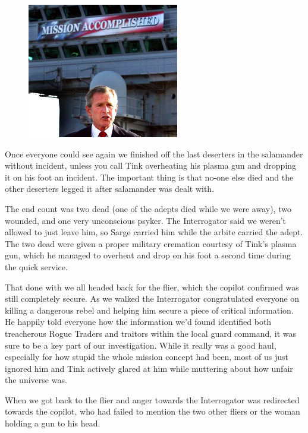 \begin{figure}
	\begin{center}
		\includegraphics[width=\figwidth]{pics/9/35.png}
	\end{center}
\end{figure}
Once everyone could see again we finished off the last deserters in the salamander without incident, unless you call Tink overheating his plasma gun and dropping it on his foot an incident. 
The important thing is that no-one else died and the other deserters legged it after salamander was dealt with. 


The end count was two dead (one of the adepts died while we were away), two wounded, and one very unconscious psyker. 
The Interrogator said we weren't allowed to just leave him, so Sarge carried him while the arbite carried the adept. 
The two dead were given a proper military cremation courtesy of Tink's plasma gun, which he managed to overheat and drop on his foot a second time during the quick service.

That done with we all headed back for the flier, which the copilot confirmed was still completely secure. 
As we walked the Interrogator congratulated everyone on killing a dangerous rebel and helping him secure a piece of critical information. 
He happily told everyone how the information we'd found identified both treacherous Rogue Traders and traitors within the local guard command, it was sure to be a key part of our investigation. 
While it really was a good haul, especially for how stupid the whole mission concept had been, most of us just ignored him and Tink actively glared at him while muttering about how unfair the universe was.

When we got back to the flier and anger towards the Interrogator was redirected towards the copilot, who had failed to mention the two other fliers or the woman holding a gun to his head.

